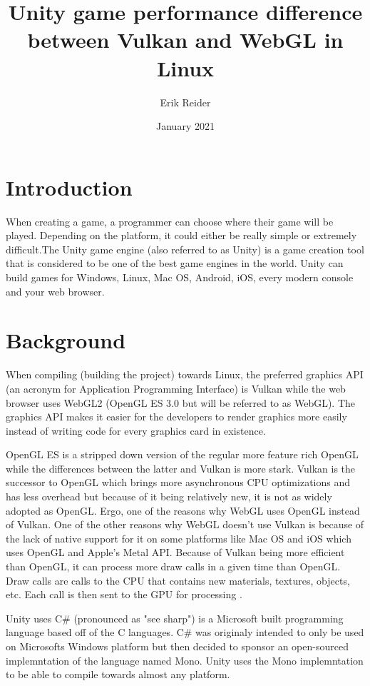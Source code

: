 \documentclass{article}
\title{Unity game performance difference between Vulkan and WebGL in Linux}
\author{Erik Reider}
\date{January 2021}
\begin{document}
\maketitle

\section{Introduction}
When creating a game, a programmer can choose where their game will be played. Depending on the platform, it could either be really simple or extremely difficult.The Unity game engine (also referred to as Unity) is a game creation tool that is considered to be one of the best game engines in the world. Unity can build games for Windows, Linux, Mac OS, Android, iOS, every modern console and your web browser.

\section{Background}
When compiling (building the project) towards Linux, the preferred graphics API (an acronym for Application Programming Interface) is Vulkan while the web browser uses WebGL2 (OpenGL ES 3.0 but will be referred to as WebGL). The graphics API makes it easier for the developers to render graphics more easily instead of writing code for every graphics card in existence\cite{APIWiki}. \par

OpenGL ES is a stripped down version of the regular more feature rich OpenGL while the differences between the latter and Vulkan is more stark. Vulkan is the successor to OpenGL which brings more asynchronous CPU optimizations and has less overhead but because of it being relatively new, it is not as widely adopted as OpenGL. Ergo, one of the reasons why WebGL uses OpenGL instead of Vulkan. One of the other reasons why WebGL doesn’t use Vulkan is because of the lack of native support for it on some platforms like Mac OS and iOS which uses OpenGL and Apple’s Metal API. Because of Vulkan being more efficient than OpenGL, it can process more draw calls in a given time than OpenGL. Draw calls are calls to the CPU that contains new materials, textures, objects, etc. Each call is then sent to the GPU for processing \cite{DrawCalls}. \par

Unity uses C\# (pronounced as "see sharp") is a Microsoft built programming language based off of the C languages. C\# was originaly intended to only be used on Microsofts Windows platform but then decided to sponsor an open-sourced implemntation of the language named Mono\cite{CSharpWiki}. Unity uses the Mono implemntation to be able to compile towards almost any platform.
\end{document}
